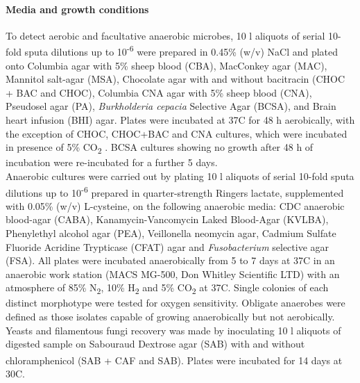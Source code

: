 \paragraph{Media and growth conditions} To detect aerobic and facultative anaerobic microbes, 10 {\textmu}l aliquots of serial 10-fold sputa dilutions up to 10\textsuperscript{{}-6} were prepared in 0.45\% (w/v) NaCl  and plated onto Columbia agar with 5\% sheep blood (CBA), MacConkey agar (MAC), Mannitol salt-agar (MSA), Chocolate agar with and without bacitracin (CHOC + BAC and CHOC), Columbia CNA agar with 5\% sheep blood (CNA), Pseudosel agar (PA),  \textit{Burkholderia cepacia} Selective Agar (BCSA), and Brain heart infusion (BHI) agar. Plates were incubated at 37{\textdegree}C for 48 h aerobically, with the exception of CHOC, CHOC+BAC and CNA cultures, which were incubated in presence of 5\% CO\textsubscript{2} \cite{burns1998microbiology}. BCSA cultures showing no growth after 48 h of incubation were re-incubated for a further 5 days.\\
Anaerobic cultures were carried out by plating 10 {\textmu}l aliquots of serial 10-fold sputa dilutions up to 10\textsuperscript{-6} prepared in quarter-strength Ringers lactate, supplemented with 0.05\% (w/v) L-cysteine, on the following anaerobic media: CDC anaerobic blood-agar (CABA), Kanamycin-Vancomycin Laked Blood-Agar (KVLBA), Phenylethyl alcohol agar (PEA), Veillonella neomycin agar, Cadmium Sulfate Fluoride Acridine Trypticase (CFAT) agar and \textit{Fusobacterium }selective agar (FSA). All plates were incubated anaerobically from 5 to 7 days at 37{\textdegree}C in an anaerobic work station (MACS MG-500, Don Whitley Scientific LTD) with an atmosphere of 85\% N\textsubscript{2}, 10\% H\textsubscript{2} and 5\% CO\textsubscript{2} at 37{\textdegree}C. Single colonies of each distinct morphotype were tested for oxygen sensitivity. Obligate anaerobes were defined as those isolates capable of growing anaerobically but not aerobically. Yeasts and filamentous fungi recovery was made by inoculating 10 {\textmu}l aliquots of digested sample on Sabouraud Dextrose agar (SAB) with and without chloramphenicol (SAB \-+\textsuperscript{ }CAF and SAB). Plates were incubated for 14 days at 30{\textdegree}C.\\
